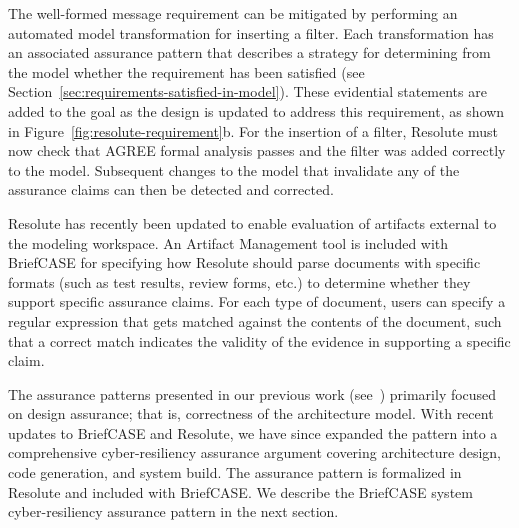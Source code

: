 The well-formed message requirement can be mitigated by performing an automated model transformation for inserting a filter. Each transformation has an associated assurance pattern that describes a strategy for determining from the model whether the requirement has been satisfied (see Section~\ref{sec:requirements-satisfied-in-model}).  
These evidential statements are added to the goal as the design is updated to address this requirement, as shown in Figure~\ref{fig:resolute-requirement}b.  For the insertion of a filter, Resolute must now check that AGREE formal analysis passes and the filter was added correctly to the model.
Subsequent changes to the model that invalidate any of the assurance claims can then be detected and corrected.  

Resolute has recently been updated to enable evaluation of artifacts external to the modeling workspace. An Artifact Management tool is included with BriefCASE for specifying how Resolute should parse documents with specific formats (such as test results, review forms, etc.) to determine whether they support specific assurance claims.  For each type of document, users can specify a regular expression that gets matched against the contents of the document, such that a correct match indicates the validity of the evidence in supporting a specific claim.

The assurance patterns presented in our previous work (see~\cite{resolute-destion}) primarily focused on design assurance; that is, correctness of the architecture model.  With recent updates to BriefCASE and Resolute, we have since expanded the pattern into a comprehensive cyber-resiliency assurance argument covering architecture design, code generation, and system build.  The assurance pattern is formalized in Resolute and included with BriefCASE.
%
We describe the BriefCASE system cyber-resiliency assurance pattern in the next section.
